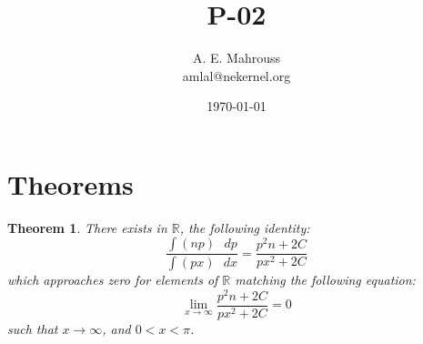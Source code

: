 \documentclass[10pt, twocolumn]{article}
\title{P-02}
\author{A. E. Mahrouss\\amlal@nekernel.org}
\date{\today}
\theoremstyle{plain}
\newtheorem{theorem}{Theorem}[section]
\theoremstyle{definition}
\theoremstyle{remark}
\begin{document}
\maketitle

\section{Theorems}
\begin{theorem}
    There exists in $\mathbb{R}$, the following identity:
    \begin{equation}
        \frac{\int (np) \text{ } dp}{\int (px) \text{ } dx} = \frac{p^2n+2C}{px^2+2C}
    \end{equation}
    which approaches zero for elements of $\mathbb{R}$ matching the following equation:
    \begin{equation}
        \lim_{x\to\infty} \frac{p^2n+2C}{px^2+2C} = 0
    \end{equation}
    such that $x \to \infty$, and $0 < x < \pi$.
\end{theorem}
\end{document}
